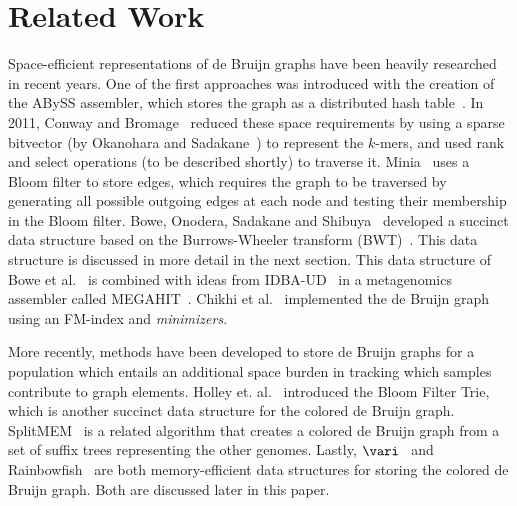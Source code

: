  

\section{Related Work}


Space-efficient representations of de Bruijn graphs have been heavily researched in recent years. One of the first approaches was introduced with the creation of the ABySS assembler, which stores the graph as a distributed hash table~\cite{Simpson:2009}.  In 2011, Conway and Bromage~\cite{conway} reduced these space requirements  by using a sparse bitvector (by Okanohara and Sadakane~\cite{bitvector}) to represent the $k$-mers, and used rank and select operations (to be described shortly) to traverse it.  Minia~\cite{wabi} uses a Bloom filter to store edges, which requires the graph to be traversed by generating all possible outgoing edges at each node and testing their membership in the Bloom filter. Bowe, Onodera, Sadakane and Shibuya~\cite{BOSS} developed a succinct data structure based on the Burrows-Wheeler transform  (BWT)~\cite{bw1994}.  This data structure is discussed in more detail in the next section.  This data structure of Bowe et al.~\cite{BOSS} is combined with ideas from IDBA-UD~\cite{idbaud} in a metagenomics assembler called MEGAHIT~\cite{megahit}.   Chikhi {et al.}~\cite{paul} implemented the de Bruijn graph using an FM-index and {\em minimizers}.

More recently, methods have been developed to store de Bruijn graphs for a population which entails an additional space burden in tracking which samples contribute to graph elements. Holley et. al.~\cite{holley2015bloom} introduced the Bloom Filter Trie, which is another succinct data structure for the colored de Bruijn graph.  SplitMEM~\cite{splitmem} is a related algorithm that creates a colored de Bruijn graph from a set of suffix trees representing the other genomes.  Lastly, $\vari$~\cite{vari} and Rainbowfish~\cite{rainbowfish} are both memory-efficient data structures for storing the colored de Bruijn graph.  Both are discussed later in this paper.

